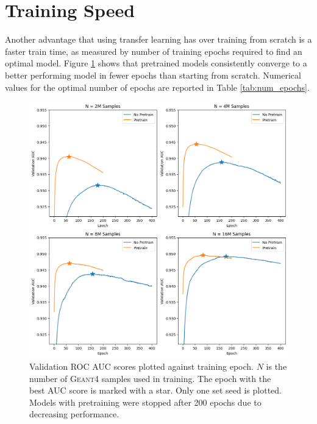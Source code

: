 \section{Training Speed}

Another advantage that using transfer learning has over training from scratch is a faster train time, as measured by number of training epochs required to find an optimal model. Figure \ref{fig:four_loss_curves} shows that pretrained models consistently converge to a better performing model in fewer epochs than starting from scratch. Numerical values for the optimal number of epochs are reported in Table \ref{tab:num_epochs}.

\begin{figure}
    \centering
    \includegraphics[width=1\linewidth]{figures/four_loss_curves.png}
    \caption{Validation ROC AUC scores plotted against training epoch. $N$ is the number of \textsc{Geant4} samples used in training. The epoch with the best AUC score is marked with a star. Only one set seed is plotted. Models with pretraining were stopped after 200 epochs due to decreasing performance.}
    \label{fig:four_loss_curves}
\end{figure}

